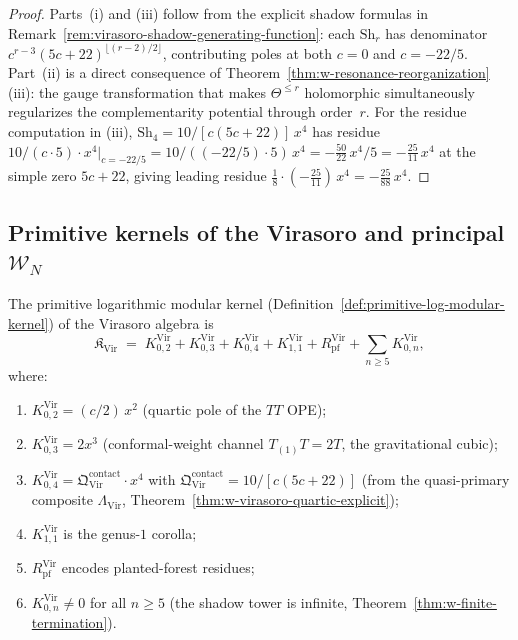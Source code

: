 \begin{proof}
Parts~(i) and (iii) follow from the explicit shadow formulas
in Remark~\ref{rem:virasoro-shadow-generating-function}:
each $\mathrm{Sh}_r$ has denominator $c^{r-3}(5c+22)^{\lfloor (r-2)/2\rfloor}$,
contributing poles at both $c = 0$ and $c = -22/5$.
Part~(ii) is a direct consequence of
Theorem~\ref{thm:w-resonance-reorganization}(iii): the gauge
transformation that makes $\Theta^{\leq r}$ holomorphic simultaneously
regularizes the complementarity potential through order~$r$.
For the residue computation in (iii),
$\mathrm{Sh}_4 = 10/[c(5c+22)]\,x^4$ has residue
$10/(c \cdot 5) \cdot x^4|_{c=-22/5}
= 10/((-22/5)\cdot 5)\,x^4 = -\frac{50}{22}\,x^4/5
= -\frac{25}{11}\,x^4$
at the simple zero $5c+22$, giving leading residue
$\frac{1}{8}\cdot(-\frac{25}{11})\,x^4 = -\frac{25}{88}\,x^4$.
\end{proof}

\subsection{Primitive kernels of the Virasoro and principal
\texorpdfstring{$\mathcal{W}_N$}{WN}}
\label{subsec:virasoro-wn-primitive-kernel}

\begin{proposition}
\label{prop:virasoro-primitive-kernel}
The primitive logarithmic modular kernel
\textup{(}Definition~\textup{\ref{def:primitive-log-modular-kernel})}
of the Virasoro algebra is
\begin{equation}\label{eq:virasoro-primitive-kernel}
\mathfrak{K}_{\mathrm{Vir}}
\;=\;
K_{0,2}^{\mathrm{Vir}} + K_{0,3}^{\mathrm{Vir}}
+ K_{0,4}^{\mathrm{Vir}} + K_{1,1}^{\mathrm{Vir}}
+ R_{\mathrm{pf}}^{\mathrm{Vir}}
+ \sum_{n \geq 5} K_{0,n}^{\mathrm{Vir}},
\end{equation}
where:
\begin{enumerate}[label=\textup{(\roman*)}]
\item $K_{0,2}^{\mathrm{Vir}} = (c/2)\,x^2$
  \textup{(}quartic pole of the $TT$ OPE\textup{)};
\item $K_{0,3}^{\mathrm{Vir}} = 2x^3$
  \textup{(}conformal-weight channel
  $T_{(1)}T = 2T$, the gravitational cubic\textup{)};
\item $K_{0,4}^{\mathrm{Vir}}
  = \mathfrak{Q}^{\mathrm{contact}}_{\mathrm{Vir}}\cdot x^4$
  with $\mathfrak{Q}^{\mathrm{contact}}_{\mathrm{Vir}}
  = 10/[c(5c{+}22)]$
  \textup{(}from the quasi-primary composite $\Lambda_{\mathrm{Vir}}$,
  Theorem~\textup{\ref{thm:w-virasoro-quartic-explicit})};
\item $K_{1,1}^{\mathrm{Vir}}$ is the genus-$1$ corolla;
\item $R_{\mathrm{pf}}^{\mathrm{Vir}}$ encodes planted-forest residues;
\item $K_{0,n}^{\mathrm{Vir}} \neq 0$ for all $n \geq 5$
  \textup{(}the shadow tower is infinite,
  Theorem~\textup{\ref{thm:w-finite-termination})}.
\end{enumerate}
\end{proposition}

